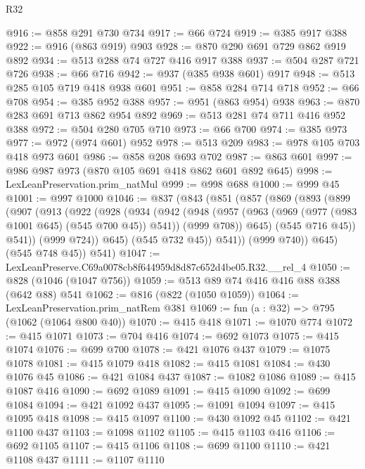 \begin{lexlean}{R32}
\begin{coremodule}
@916 := @858 @291 @730 @734
@917 := @66 @724
@919 := @385 @917 @388
@922 := @916 (@863 @919) @903
@928 := @870 @290 @691 @729 @862 @919 @892
@934 := @513 @288 @74 @727 @416 @917 @388
@937 := @504 @287 @721 @726
@938 := @66 @716
@942 := @937 (@385 @938 @601) @917
@948 := @513 @285 @105 @719 @418 @938 @601
@951 := @858 @284 @714 @718
@952 := @66 @708
@954 := @385 @952 @388
@957 := @951 (@863 @954) @938
@963 := @870 @283 @691 @713 @862 @954 @892
@969 := @513 @281 @74 @711 @416 @952 @388
@972 := @504 @280 @705 @710
@973 := @66 @700
@974 := @385 @973
@977 := @972 (@974 @601) @952
@978 := @513 @209
@983 := @978 @105 @703 @418 @973 @601
@986 := @858 @208 @693 @702
@987 := @863 @601
@997 := @986 @987 @973 (@870 @105 @691 @418 @862 @601 @892 @645)
@998 := LexLeanPreservation.prim_natMul
@999 := @998 @688
@1000 := @999 @45
@1001 := @997 @1000
@1046 := @837
    (@843
      (@851
        (@857
          (@869
            (@893
              (@899
                (@907
                  (@913
                    (@922
                      (@928
                        (@934
                          (@942
                            (@948
                              (@957
                                (@963 (@969 (@977 (@983 @1001 @645) (@545 @700 @45)) @541))
                                (@999 @708))
                              @645)
                            (@545 @716 @45))
                          @541))
                      (@999 @724))
                    @645)
                  (@545 @732 @45))
                @541))
            (@999 @740))
          @645)
        (@545 @748 @45))
      @541)
@1047 := LexLeanPreserve.C69a0078cb8f644959d8d87c652d4be05.R32.__rel_4
@1050 := @828 (@1046 (@1047 @756))
@1059 := @513 @89 @74 @416 @416 @88 @388 (@642 @88) @541
@1062 := @816 (@822 (@1050 @1059))
@1064 := LexLeanPreservation.prim_natRem @381
@1069 := fun (a : @32) => @795 (@1062 (@1064 @800 @40))
@1070 := @415 @418
@1071 := @1070 @774
@1072 := @415 @1071
@1073 := @704 @416
@1074 := @692 @1073
@1075 := @415 @1074
@1076 := @699 @700
@1078 := @421 @1076 @437
@1079 := @1075 @1078
@1081 := @415 @1079 @418
@1082 := @415 @1081
@1084 := @430 @1076 @45
@1086 := @421 @1084 @437
@1087 := @1082 @1086
@1089 := @415 @1087 @416
@1090 := @692 @1089
@1091 := @415 @1090
@1092 := @699 @1084
@1094 := @421 @1092 @437
@1095 := @1091 @1094
@1097 := @415 @1095 @418
@1098 := @415 @1097
@1100 := @430 @1092 @45
@1102 := @421 @1100 @437
@1103 := @1098 @1102
@1105 := @415 @1103 @416
@1106 := @692 @1105
@1107 := @415 @1106
@1108 := @699 @1100
@1110 := @421 @1108 @437
@1111 := @1107 @1110

\end{coremodule}
\end{lexlean}

